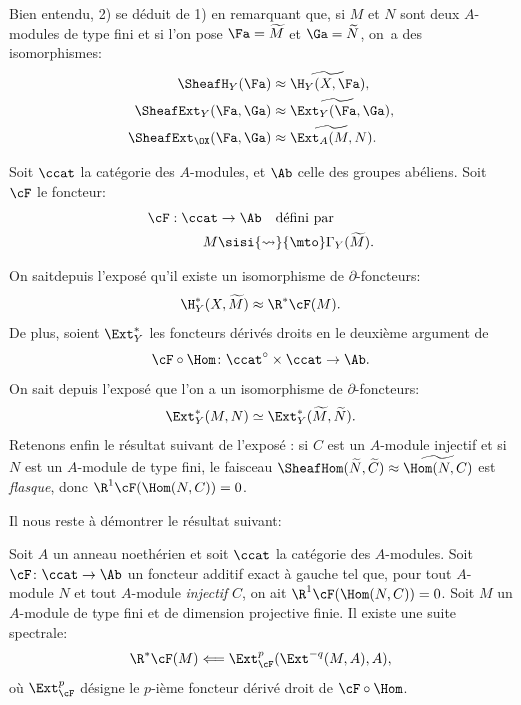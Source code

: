 Bien entendu, 2) se d\'eduit de 1) en remarquant que, si $M$ et $N$ sont deux $A$-modules de type fini et si l'on pose ${{\Fa}}=\widetilde{M}$ et ${{\Ga}}=\widetilde{N}$, on~a des isomorphismes:
\begin{align*}
\SheafH_Y({\Fa}) &\approx \widetilde{\H_Y(X, {\Fa})}, \\
\SheafExt_Y({\Fa}, {\Ga}) &\approx \widetilde{\Ext_Y({\Fa}, {\Ga}}), \\
\SheafExt_{\OX}({\Fa}, {\Ga}) &\approx \widetilde{\Ext_A(M, N)}.
\end{align*}

Soit $\ccat$ la cat\'egorie des $A$-modules, et $\Ab$ celle des groupes ab\'eliens. Soit ${\cF}$ le foncteur:
\begin{align*}
\cF: \ccat&\to \Ab \quad\text{d\'efini par} \\
 M &\sisi{\rightsquigarrow}{\mto} \Gamma_Y(\widetilde{M}).
\end{align*}

On sait\pageoriginale depuis l'expos\'e  qu'il existe un isomorphisme de $\partial$-foncteurs:
\[
\H^\ast_Y(X, \widetilde{M})\approx \R^\ast {\cF}(M).
\]
De plus, soient $\Ext^\ast_Y$ les foncteurs d\'eriv\'es droits en le deuxi\`eme argument de
\[{\cF}\circ \Hom\colon \ccat^\circ \times \ccat \to \Ab.
\]
On sait depuis l'expos\'e  que l'on a un isomorphisme de $\partial$-foncteurs:
\[
\Ext^\ast_Y(M, N)\simeq \Ext^\ast_Y(\widetilde{M}, \widetilde{N}).
\]
Retenons enfin le r\'esultat suivant de l'expos\'e : si $C$ est un $A$-module injectif et si $N$ est un $A$-module de type fini, le faisceau $\SheafHom(\widetilde{N}, \widetilde{C})\approx\widetilde{\Hom(N, C)}$ est \emph{flasque}, donc $\R^1{\cF}(\Hom(N, C))=0$.

Il nous reste \`a d\'emontrer le r\'esultat suivant:

\begin{lemme} \label{VIII.1.2} Soit $A$ un anneau noeth\'erien et soit $\ccat$ la cat\'egorie des $A$-modules. Soit ${\cF}\colon \ccat\to\Ab$ un foncteur additif exact \`a gauche tel que, pour tout $A$-module $N$  et tout $A$-module \emph{injectif} $C$, on ait $\R^1{\cF}(\Hom(N, C))=0$. Soit $M$ un $A$-module de type fini et de dimension projective finie. Il existe une suite spectrale:
\[
\R^\ast {\cF}(M)\Longleftarrow \Ext^p_{{\cF}}(\Ext^{-q}(M, A), A), \]
o\`u $\Ext^p_{{\cF}}$ d\'esigne le $p$-i\`eme foncteur d\'eriv\'e droit de ${\cF}\circ \Hom$.
\end{lemme}

